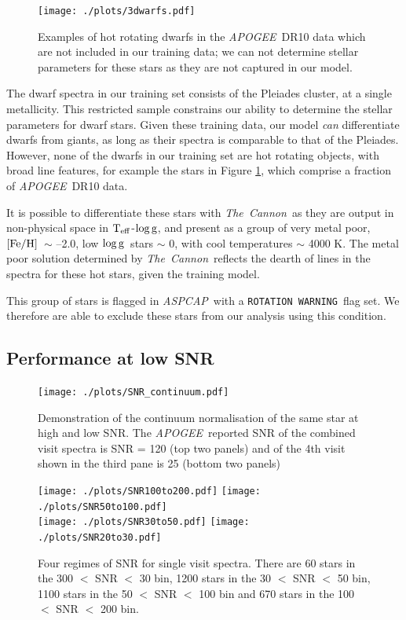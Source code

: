 \documentclass[12pt, preprint]{aastex}
\newcommand{\teff}{\mbox{$\rm T_{eff}$}}
\newcommand{\feh}{\mbox{$\rm [Fe/H]$}}
\newcommand{\logg}{\mbox{$\rm \log g$}}
\newcommand{\tc}{\textsl{The~Cannon}}
\newcommand{\apogee}{\textsl{APOGEE}}
\newcommand{\aspcap}{\textsl{ASPCAP}}
\newcommand{\rotwarn}{\texttt{ROTATION WARNING}}
\begin{document}
 
  \begin{figure}[!h]
   \centering
 \texttt{[image: ./plots/3dwarfs.pdf]}
  \caption{Examples of hot rotating dwarfs in the \apogee\ DR10 data which are not included in our training data; we can not determine stellar parameters for these stars as they are not captured in our model.}
\label{fig:dwarfs}
\end{figure}


The dwarf spectra in our training set consists of the Pleiades cluster, at a single metallicity. This restricted sample constrains our ability to determine the stellar parameters for dwarf stars. Given these training data, our model \textit{can} differentiate dwarfs from giants, as long as their spectra is comparable to that of the Pleiades. However, none of the dwarfs in our training set are hot rotating objects, with broad line features, for example the stars in Figure \ref{fig:dwarfs}, which comprise a fraction of \apogee\ DR10 data. 

It is possible to differentiate these stars with \tc\, as they are output in non-physical space in \teff-\logg, and present as a group of very metal poor, \feh\ $\sim$ --2.0, low \logg\ stars $\sim$ 0, with cool temperatures $\sim$ 4000 K. The metal poor solution determined by \tc\ reflects the dearth of lines in the spectra for these hot stars, given the training model. 

This group of stars is flagged in \aspcap\ with a \rotwarn\ flag set. We therefore are able to exclude these stars from our analysis using this condition. 
 

 


 \subsection{Performance at low SNR}
 
 \begin{figure}[!h]
  \texttt{[image: ./plots/SNR\_continuum.pdf]}
  \caption{Demonstration of the continuum normalisation of the same star at high and low SNR. The \apogee\ reported SNR of the combined visit spectra is SNR = 120 (top two panels) and of the 4th visit shown in the third pane is 25 (bottom two panels) }
\label{fig:lowsnr}
\end{figure}

 \begin{figure}[!h]
 \centering
 \texttt{[image: ./plots/SNR100to200.pdf]}
\texttt{[image: ./plots/SNR50to100.pdf]}\\
\texttt{[image: ./plots/SNR30to50.pdf]}
\texttt{[image: ./plots/SNR20to30.pdf]}
    \caption{Four regimes of SNR for single visit spectra. There are 60 stars in the 300 $<$  SNR $<$ 30 bin, 1200 stars in the 30 $<$ SNR $<$ 50 bin, 1100 stars in the 50 $<$ SNR $<$ 100 bin and 670 stars in the 100 $<$  SNR $<$ 200 bin.}
\label{fig:SNR}
\end{figure}
\end{document}
